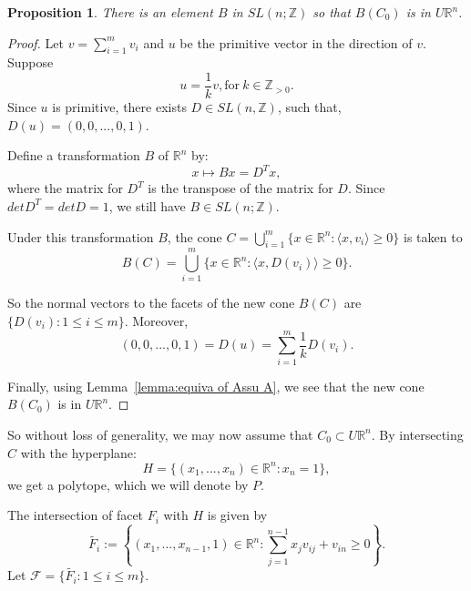 \documentclass[12pt]{amsart}
\newtheorem{proposition}[theorem]{Proposition}
\theoremstyle{definition}
\numberwithin{equation}{section}
\begin{document}
\begin{proposition}\label{prop:moving to upper half}
There is an element $B$ in $SL(n;{{\mathbb{Z}}})$ so that $B(C_{0})$ is in
$U{{\mathbb{R}}}^n$.
\end{proposition}
\begin{proof}
Let $v=\sum_{i=1}^{m}v_{i}$ and $u$ be the primitive vector in the
direction of $v$. Suppose
\begin{equation*}
u=\frac{1}{k}v, \mbox{for}\ k\in {{\mathbb{Z}}}_{>0}.
\end{equation*}
Since $u$ is primitive, there exists $D\in SL(n,{{\mathbb{Z}}})$, such that,
$D(u)=(0,0,...,0,1)$.

Define a transformation $B$ of ${{\mathbb{R}}}^n$ by:
\begin{equation}
x\mapsto Bx= D^{T}x ,
\end{equation}
where the matrix for $D^{T}$ is the transpose of the matrix for $D$.
Since $det D^{T}=det D=1$, we still have $B\in SL(n;{{\mathbb{Z}}})$.

Under this transformation $B$, the cone $C = \bigcup_{i=1}^{m}\{x\in
{{\mathbb{R}}}^n: \langle x, v_{i}\rangle \geq 0\}$ is taken to
\begin{equation}B(C)= \bigcup_{i=1}^{m}\{x\in {{\mathbb{R}}}^n: \langle x,
D(v_{i})\rangle \geq 0\}.\end{equation}

So the normal vectors to the facets of the new cone $B(C)$ are
$\{D(v_{i}):1\leq i\leq m\}$. Moreover,
\begin{equation}
(0,0,...,0,1)=D(u)=\sum_{i=1}^{m}\frac{1}{k}D(v_{i}).
\end{equation}

Finally, using Lemma~\ref{lemma:equiva of Assu A}, we see that the
new cone $B(C_{0})$ is in $U{{\mathbb{R}}}^n$.
\end{proof}

So without loss of generality, we may now assume that $C_{0}\subset
U{{\mathbb{R}}}^n$. By intersecting $C$ with the hyperplane:
\begin{equation}
H= \{(x_{1},...,x_{n})\in {{\mathbb{R}}}^n: x_{n}=1\},
\end{equation}
we get a polytope, which we will denote by $P$.

The intersection of facet $F_{i}$ with $H$ is given by
\[\tilde{F_{i}}:=\left\{(x_{1},...,x_{n-1},1)\in {{\mathbb{R}}}^n:\sum_{j=1}^{n-1}x_{j}v_{ij}+v_{in} \geq 0\right\}.\]
Let ${{\mathcal{F}}}= \{\tilde{F_{i}}:1\leq i\leq m\}$.
\end{document}
